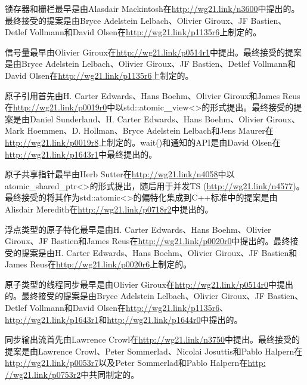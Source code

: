 锁存器和栅栏最早是由Alasdair Mackintosh在\url{http://wg21.link/n3600}中提出的。最终接受的提案是由Bryce Adelstein Lelbach、Olivier Giroux、JF Bastien、Detlef Vollmann和David Olsen在\url{http://wg21.link/p1135r6}上制定的。

信号量最早由Olivier Giroux在\url{http://wg21.link/p0514r1}中提出。最终接受的提案是由Bryce Adelstein Lelbach、Olivier Giroux、JF Bastien、Detlef Vollmann和David Olsen在\url{http://wg21.link/p1135r6}上制定的。

原子引用首先由H. Carter Edwards、Hans Boehm、Olivier Giroux和James Reus在\url{http://wg21.link/p0019r0}中以std::atomic＿view<>的形式提出。最终接受的提案是由Daniel Sunderland、H. Carter Edwards、Hans Boehm、Olivier Giroux、Mark Hoemmen、D. Hollman、Bryce Adelstein Lelbach和Jens Maurer在\url{http://wg21.link/p0019r8}上制定的。wait()和通知的API是由David Olsen在\url{http://wg21.link/p1643r1}中最终提出的。

原子共享指针最早由Herb Sutter在\url{http://wg21.link/n4058}中以atomic\_shared\_ptr<>的形式提出，随后用于并发TS (\url{http://wg21.link/n4577})。最终接受的将其作为std::atomic<>的偏特化集成到C++标准中的提案是由Alisdair Meredith在\url{http://wg21.link/p0718r2}中提出的。

浮点类型的原子特化最早是由H. Carter Edwards、Hans Boehm、Olivier Giroux、JF Bastien和James Reus在\url{http://wg21.link/p0020r0}中提出的。最终接受的提案是由H. Carter Edwards、Hans Boehm、Olivier Giroux、JF Bastien和James Reus在\url{http://wg21.link/p0020r6}上制定的。

原子类型的线程同步最早是由Olivier Giroux在\url{http://wg21.link/p0514r0}中提出的。最终接受的提案是由Bryce Adelstein Lelbach、Olivier Giroux、JF Bastien、Detlef Vollmann和David Olsen在\url{http://wg21.link/p1135r6}、\url{http://wg21.link/p1643r1}和\url{http://wg21.link/p1644r0}中提出的。

同步输出流首先由Lawrence Crowl在\url{http://wg21.link/n3750}中提出。最终接受的提案是由Lawrence Crowl、Peter Sommerlad、Nicolai Josuttis和Pablo Halpern在\url{http://wg21.link/p0053r7}以及Peter Sommerlad和Pablo Halpern在\url{http: //wg21.link/p0753r2}中共同制定的。

